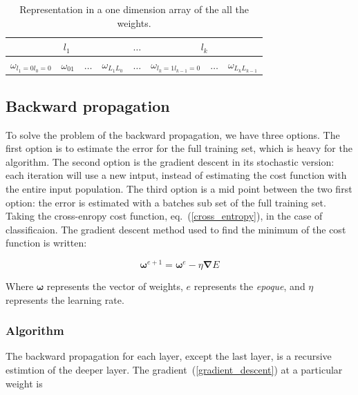 \documentclass[final, paper=letter,5p,times,twocolumn]{elsarticle}
\begin{document}
\begin{table}[]
\centering
\caption{Representation in a one dimension array of the all the weights.}
\label{weights_in_mem}
\begin{tabular}{|c|c|c|c|c|c|c|c|}
\hline
\multicolumn{4}{|c|}{$l_{1}$} & $\hdots$ & \multicolumn{3}{c|}{$l_{k}$} \\ \hline
$\omega_{l_{1}=0l_{0}=0}$   &   $\omega_{01}$   & $\hdots$  &  $\omega_{L_{1}L_{0}}$   & $\hdots$ &    $\omega_{l_{k}=1l_{k-1}=0}$    & $\hdots$  &   $\omega_{L_{k}L_{k-1}}$ \\ \hline
\end{tabular}
\end{table}

\subsection{Backward propagation}

To solve the problem of the backward propagation, we have three options. The first option is to estimate the error for the full training set, which is heavy for the algorithm. The second option is the gradient descent in its stochastic version: each iteration will use a new intput, instead of estimating the cost function with the entire input population. The third option is a mid point between the two first option: the error is estimated with a batches sub set of the full training set.
Taking the cross-enropy cost function, eq.~(\ref{cross_entropy}), in the case of classificaion. The gradient descent method used to find the minimum of the cost function is written:

\begin{equation}
  \bm{\omega}^{e+1} = \bm{\omega}^{e} - \eta \bm{\nabla} E
  \label{gradient_descent}
\end{equation}

Where $\bm{\omega}$ represents the vector of weights, $e$ represents the {\it epoque}, and $\eta$ represents the learning rate. 


\subsubsection{Algorithm}

The backward propagation for each layer, except the last layer, is a recursive estimtion of the deeper layer. The gradient~(\ref{gradient_descent}) at a particular weight is
\end{document}
